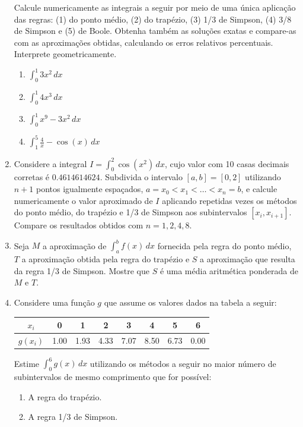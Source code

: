 \documentclass[12pt,a4paper]{article}
\begin{document}
\begin{enumerate}
Calcule numericamente as integrais a seguir por meio de uma única aplicação das regras: (1) do ponto médio, (2) do trapézio, (3) 1/3 de Simpson, (4) 3/8 de Simpson e (5) de Boole. Obtenha também as soluções exatas e compare-as com as aproximações obtidas, calculando os erros relativos percentuais. Interprete geometricamente.
\begin{multicols}{4}
\begin{enumerate}
\item $\int_0^1 3x^2 \,dx$
\item $\int_0^1 4x^3 \,dx$
\item $\int_{0}^1 x^9 - 3x^2 \,dx$
\item $\int_{1}^5 \frac{4}{x} - \cos(x) \,dx$
\end{enumerate}
\end{multicols}

\item Considere a integral $I = \int_0^2 \cos(x^2)\, dx$, cujo valor com 10 casas decimais corretas é $0.4614614624$. Subdivida o intervalo $[a, b] = [0, 2]$ utilizando $n+1$ pontos igualmente espaçados, $a = x_0 < x_1 < \ldots < x_n = b$, e calcule numericamente o valor aproximado de $I$ aplicando repetidas vezes os métodos do ponto médio, do trapézio e 1/3 de Simpson aos subintervalos $[x_i,x_{i+1}]$. Compare os resultados obtidos com $n = 1, 2, 4, 8$.

\item Seja $M$ a aproximação de $\int_a^b f(x)\, dx$ fornecida pela regra do ponto médio, $T$ a aproximação obtida pela regra do trapézio e $S$ a aproximação que resulta da regra 1/3 de Simpson. Mostre que $S$ é uma média aritmética ponderada de $M$ e $T$.

\item Considere uma função $g$ que assume os valores dados na tabela a seguir:
\begin{center}
\begin{tabular}{|c|c|c|c|c|c|c|c|}
\hline
   $x_i$ & 0 & 1 & 2 & 3 & 4 & 5 & 6 \\ \hline
$g(x_i)$ & 1.00 & 1.93 & 4.33 & 7.07 & 8.50 & 6.73 & 0.00 \\ \hline
\end{tabular}
\end{center}
Estime $\int_0^6 g(x)\,dx$ utilizando os métodos a seguir no maior número de subintervalos de mesmo comprimento que for possível:
\begin{multicols}{2}
\begin{enumerate}
\item A regra do trapézio.
\item A regra 1/3 de Simpson.
\end{enumerate}
\end{multicols}


\end{enumerate}
\end{document}
